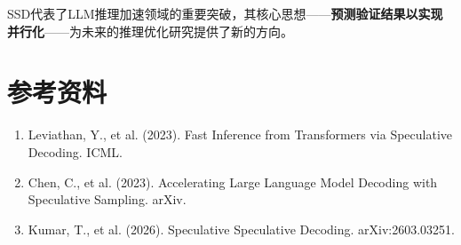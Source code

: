 \documentclass[11pt,a4paper]{article}
\begin{document}
\vspace{1cm}

SSD代表了LLM推理加速领域的重要突破，其核心思想——\textbf{预测验证结果以实现并行化}——为未来的推理优化研究提供了新的方向。

\section{参考资料}

\begin{enumerate}
  \item Leviathan, Y., et al. (2023). Fast Inference from Transformers via Speculative Decoding. ICML.
  \item Chen, C., et al. (2023). Accelerating Large Language Model Decoding with Speculative Sampling. arXiv.
  \item Kumar, T., et al. (2026). Speculative Speculative Decoding. arXiv:2603.03251.
\end{enumerate}
\end{document}
